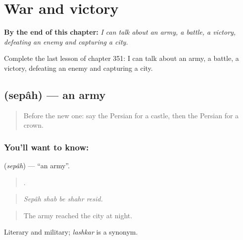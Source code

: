 
\chapter{War and victory}
\label{ch:fa-war-and-victory}

\begin{chapteropening}
\textbf{By the end of this chapter:} \emph{I can talk about an army, a battle, a victory, defeating an enemy and capturing a city.}

Complete the last lesson of chapter 351: I can talk about an army, a battle, a victory, defeating an enemy and capturing a city.
\end{chapteropening}

\section[\texorpdfstring{\fa{سپاه} (sepâh)}{سپاه (sepâh)}]{ (sepâh) — an army}

\label{lesson:FA-C351-sepah}



\begin{quote}
Before the new one: say the Persian for a castle, then the Persian for a crown.
\end{quote}

\subsection*{You'll want to know: }
\textbf{} (\emph{sepâh}) — \textquotedblleft{}an army\textquotedblright{}.

\begin{quote}
    .
\end{quote}

\begin{quote}
\emph{Sepâh shab be shahr resid.}
\end{quote}

\begin{quote}
The army reached the city at night.
\end{quote}

Literary and military; \emph{lashkar} is a synonym.

